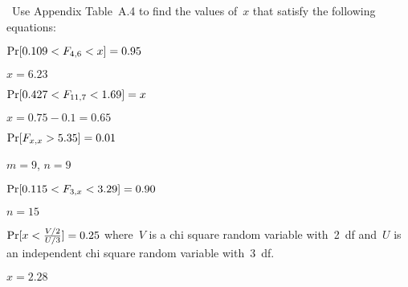 \begin{problem}
  ~Use Appendix Table~A.4 to find the values of~$x$ that satisfy the following equations:
\end{problem}

\begin{subproblem}
  $\Pr\lbrack0.109 < F_{4,6} < x\rbrack = 0.95$
\end{subproblem}

${x = 6.23}$

\begin{subproblem}
  $\Pr\lbrack0.427 < F_{11,7} < 1.69\rbrack = x$
\end{subproblem}

${x = 0.75 - 0.1 = 0.65}$

\begin{subproblem}
  $\Pr\lbrack F_{x,x} > 5.35\rbrack = 0.01$
\end{subproblem}

${m = 9}$, ${n = 9}$

\begin{subproblem}
  $\Pr\lbrack0.115 < F_{3,x} < 3.29\rbrack = 0.90$
\end{subproblem}

${n = 15}$

\begin{subproblem}
  $\Pr\lbrack x < \frac{V/2}{U/3}\rbrack = 0.25$ where~$V$ is a chi square random variable with~2~df and~$U$ is an independent chi square random variable with~3~df.
\end{subproblem}

${x = 2.28}$
